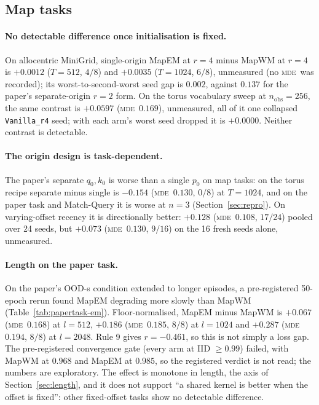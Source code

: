 \documentclass[10pt]{article}
\newcommand{\mde}{\textsc{mde}}
\newcommand{\arm}[1]{\texttt{#1}}
\begin{document}
\subsection{Map tasks}
\label{sec:c4-map}

\paragraph{No detectable difference once initialisation is fixed.} On allocentric MiniGrid, single-origin MapEM at $r=4$ minus
MapWM at $r=4$ is $+0.0012$ ($T=512$, $4/8$) and $+0.0035$ ($T=1024$, $6/8$), unmeasured (no \mde\ was
recorded); its worst-to-second-worst seed gap is $0.002$, against $0.137$ for the paper's separate-origin
$r=2$ form. On the torus vocabulary sweep at $n_{\mathrm{obs}}=256$, the same contrast is $+0.0597$ (\mde\
$0.169$), unmeasured, all of it one collapsed \arm{Vanilla\_r4} seed; with each arm's worst seed dropped it is
$+0.0000$. Neither contrast is detectable.

\paragraph{The origin design is task-dependent.} The paper's separate $q_0,k_0$ is worse than a single
$p_0$ on map tasks: on the torus recipe separate minus single is $-0.154$ (\mde\ $0.130$, $0/8$) at
$T=1024$, and on the paper task and Match-Query it is worse at $n=3$ (Section~\ref{sec:repro}). On
varying-offset recency it is directionally better: $+0.128$ (\mde\ $0.108$, $17/24$) pooled over 24
seeds, but $+0.073$ (\mde\ $0.130$, $9/16$) on the 16 fresh seeds alone, unmeasured.

\paragraph{Length on the paper task.} On the paper's OOD-s condition extended to longer episodes, a
pre-registered 50-epoch rerun found MapEM degrading more slowly than MapWM (Table~\ref{tab:papertask-em}).
Floor-normalised, MapEM minus MapWM is $+0.067$ (\mde\ $0.168$) at $l=512$, $+0.186$ (\mde\ $0.185$,
$8/8$) at $l=1024$ and $+0.287$ (\mde\ $0.194$, $8/8$) at $l=2048$. Rule 9 gives $r=-0.461$, so this is not
simply a loss gap. The pre-registered convergence gate (every arm at IID $\ge0.99$) failed, with MapWM at $0.968$
and MapEM at $0.985$, so the registered verdict is not read; the numbers are exploratory. The effect is
monotone in length, the axis of Section~\ref{sec:length}, and it does not support ``a shared kernel is
better when the offset is fixed'': other fixed-offset tasks show no detectable difference. %
\end{document}
